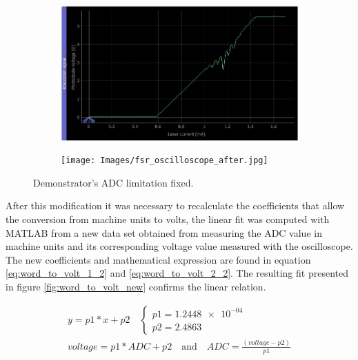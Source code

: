 \documentclass[a4paper,12pt]{article}
\begin{document}
\begin{figure}[!h]
\centering
\begin{subfigure}[b]{0.49\textwidth}
	\centering
	\includegraphics[height=0.6\textwidth]{Images/fsr_screenshot_after.jpg}
	\captionsetup{justification=centering}
\end{subfigure}
\hfill
\begin{subfigure}[b]{0.49\textwidth}
	\centering
	\texttt{[image: Images/fsr\_oscilloscope\_after.jpg]}
	\captionsetup{justification=centering}
\end{subfigure}
 \caption{Demonstrator's ADC limitation fixed.}
\label{fig:adc_limitation_fixed}
\end{figure}

After this modification it was necessary to recalculate the coefficients that allow the conversion from machine units to volts, the linear fit was computed with MATLAB from a new data set obtained from measuring the ADC value in machine units and its corresponding voltage value measured with the oscilloscope. The new coefficients and mathematical expression are found in equation \ref{eq:word_to_volt_1_2} and \ref{eq:word_to_volt_2_2}. The resulting fit presented in figure \ref{fig:word_to_volt_new} confirms the linear relation.

\begin{align}
y=p1*x+p2\quad
\begin{cases}
p1=\SI{1.2448e-04}{}\\ p2=2.4863
\end{cases}
\label{eq:word_to_volt_1_2}
\\voltage=p1*ADC+p2 \quad\text{and}\quad ADC=\frac{(voltage-p2)}{p1}
\label{eq:word_to_volt_2_2}
\end{align}
\end{document}
